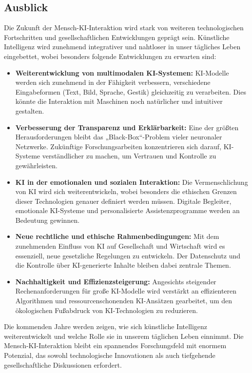 \documentclass[a4paper,12pt]{article}
\begin{document}
\subsection{Ausblick}

Die Zukunft der Mensch-KI-Interaktion wird stark von weiteren technologischen Fortschritten und gesellschaftlichen Entwicklungen geprägt sein. Künstliche Intelligenz wird zunehmend integrativer und nahtloser in unser tägliches Leben eingebettet, wobei besonders folgende Entwicklungen zu erwarten sind:

\begin{itemize} \item \textbf{Weiterentwicklung von multimodalen KI-Systemen:}
KI-Modelle werden sich zunehmend in der Fähigkeit verbessern, verschiedene Eingabeformen (Text, Bild, Sprache, Gestik) gleichzeitig zu verarbeiten. Dies könnte die Interaktion mit Maschinen noch natürlicher und intuitiver gestalten.
\item \textbf{Verbesserung der Transparenz und Erklärbarkeit:}  
Eine der größten Herausforderungen bleibt das „Black-Box“-Problem vieler neuronaler Netzwerke. Zukünftige Forschungsarbeiten konzentrieren sich darauf, KI-Systeme verständlicher zu machen, um Vertrauen und Kontrolle zu gewährleisten.

\item \textbf{KI in der emotionalen und sozialen Interaktion:}  
Die Vermenschlichung von KI wird sich weiterentwickeln, wobei besonders die ethischen Grenzen dieser Technologien genauer definiert werden müssen. Digitale Begleiter, emotionale KI-Systeme und personalisierte Assistenzprogramme werden an Bedeutung gewinnen.

\item \textbf{Neue rechtliche und ethische Rahmenbedingungen:}  
Mit dem zunehmenden Einfluss von KI auf Gesellschaft und Wirtschaft wird es essenziell, neue gesetzliche Regelungen zu entwickeln. Der Datenschutz und die Kontrolle über KI-generierte Inhalte bleiben dabei zentrale Themen.

\item \textbf{Nachhaltigkeit und Effizienzsteigerung:}  
Angesichts steigender Rechenanforderungen für große KI-Modelle wird verstärkt an effizienteren Algorithmen und ressourcenschonenden KI-Ansätzen gearbeitet, um den ökologischen Fußabdruck von KI-Technologien zu reduzieren.
\end{itemize}

Die kommenden Jahre werden zeigen, wie sich künstliche Intelligenz weiterentwickelt und welche Rolle sie in unserem täglichen Leben einnimmt. Die Mensch-KI-Interaktion bleibt ein spannendes Forschungsfeld mit enormem Potenzial, das sowohl technologische Innovationen als auch tiefgehende gesellschaftliche Diskussionen erfordert.
\newpage
\printbibliography
\end{document}
